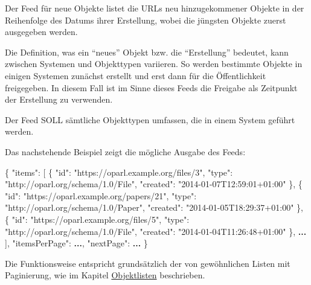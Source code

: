 \documentclass[,a4paper]{article}
\newenvironment{Shaded}{}{}
\newcommand{\DataTypeTok}[1]{\textcolor[rgb]{0.56,0.13,0.00}{{#1}}}
\newcommand{\StringTok}[1]{\textcolor[rgb]{0.25,0.44,0.63}{{#1}}}
\newcommand{\OtherTok}[1]{\textcolor[rgb]{0.00,0.44,0.13}{{#1}}}
\newcommand{\FunctionTok}[1]{\textcolor[rgb]{0.02,0.16,0.49}{{#1}}}
\newcommand{\ErrorTok}[1]{\textcolor[rgb]{1.00,0.00,0.00}{\textbf{{#1}}}}
\begin{document}
Der Feed für neue Objekte listet die URLs neu hinzugekommener Objekte in
der Reihenfolge des Datums ihrer Erstellung, wobei die jüngsten Objekte
zuerst ausgegeben werden.

Die Definition, was ein ``neues'' Objekt bzw. die ``Erstellung''
bedeutet, kann zwischen Systemen und Objekttypen variieren. So werden
bestimmte Objekte in einigen Systemen zunächst erstellt und erst dann
für die Öffentlichkeit freigegeben. In diesem Fall ist im Sinne dieses
Feeds die Freigabe als Zeitpunkt der Erstellung zu verwenden.

Der Feed SOLL sämtliche Objekttypen umfassen, die in einem System
geführt werden.

Das nachstehende Beispiel zeigt die mögliche Ausgabe des Feeds:

\begin{Shaded}
\begin{Highlighting}[]
\FunctionTok{\{}
    \DataTypeTok{"items"}\FunctionTok{:} \OtherTok{[}
        \FunctionTok{\{}
            \DataTypeTok{"id"}\FunctionTok{:} \StringTok{"https://oparl.example.org/files/3"}\FunctionTok{,}
            \DataTypeTok{"type"}\FunctionTok{:} \StringTok{"http://oparl.org/schema/1.0/File"}\FunctionTok{,}
            \DataTypeTok{"created"}\FunctionTok{:} \StringTok{"2014-01-07T12:59:01+01:00"}
        \FunctionTok{\}}\OtherTok{,}
        \FunctionTok{\{}
            \DataTypeTok{"id"}\FunctionTok{:} \StringTok{"https://oparl.example.org/papers/21"}\FunctionTok{,}
            \DataTypeTok{"type"}\FunctionTok{:} \StringTok{"http://oparl.org/schema/1.0/Paper"}\FunctionTok{,}
            \DataTypeTok{"created"}\FunctionTok{:} \StringTok{"2014-01-05T18:29:37+01:00"}
        \FunctionTok{\}}\OtherTok{,}
        \FunctionTok{\{}
            \DataTypeTok{"id"}\FunctionTok{:} \StringTok{"https://oparl.example.org/files/5"}\FunctionTok{,}
            \DataTypeTok{"type"}\FunctionTok{:} \StringTok{"http://oparl.org/schema/1.0/File"}\FunctionTok{,}
            \DataTypeTok{"created"}\FunctionTok{:} \StringTok{"2014-01-04T11:26:48+01:00"}
        \FunctionTok{\}}\OtherTok{,}
        \ErrorTok{...}
    \OtherTok{]}\FunctionTok{,}
    \DataTypeTok{"itemsPerPage"}\FunctionTok{:} \ErrorTok{...}\FunctionTok{,}
    \DataTypeTok{"nextPage"}\FunctionTok{:} \ErrorTok{...}
\FunctionTok{\}}
\end{Highlighting}
\end{Shaded}

Die Funktionsweise entspricht grundsätzlich der von gewöhnlichen Listen
mit Paginierung, wie im Kapitel \hyperref[objektlisten]{Objektlisten}
beschrieben.
\end{document}

